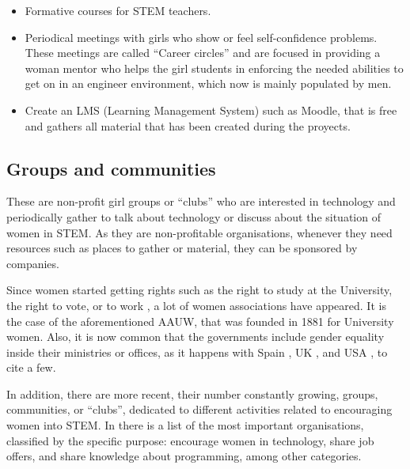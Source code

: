 \documentclass[journal,transmag]{IEEEtran}
\begin{document}
\begin{itemize}
  \item Formative courses for STEM teachers.
  \item Periodical meetings with girls who show or feel self-confidence problems. These meetings are called ``Career circles'' and are focused in providing a woman mentor who helps the girl students in enforcing the needed abilities to get on in an engineer environment, which now is mainly populated by men.
  \item Create an LMS (Learning Management System) such as Moodle, that is free and gathers all material that has been created during the proyects.
\end{itemize}

\subsection{Groups and communities}

These are non-profit girl groups or ``clubs'' who are interested in technology and periodically gather to talk about technology or discuss about the situation of women in STEM. As they are non-profitable organisations, whenever they need resources such as places to gather or material, they can be sponsored by companies.

Since women started getting rights such as the right to study at the University, the right to vote, or to work \cite{glover1995women}, a lot of women associations have appeared. It is the case of the aforementioned AAUW, that was founded in 1881 for University women. Also, it is now common that the governments include gender equality inside their ministries or offices, as it happens with Spain \cite{inmujer:site}, UK \cite{ukgequ:site}, and USA \cite{uswomen:site, aauw:site}, to cite a few.

In addition, there are more recent, their number constantly growing, groups, communities, or ``clubs'', dedicated to different activities related to encouraging women into STEM. In \cite{kira2012} there is a list of the most important organisations, classified by the specific purpose: encourage women in technology, share job offers, and share knowledge about programming, among other categories.
\end{document}
